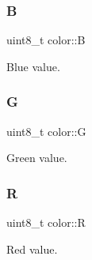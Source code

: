 \subsubsection{\texorpdfstring{B}{B}}
{\footnotesize\ttfamily uint8\+\_\+t color\+::B}



Blue value. 

\mbox{\label{group__video_ga4eca011840c222b0813c622714e7a2b5}} 
\subsubsection{\texorpdfstring{G}{G}}
{\footnotesize\ttfamily uint8\+\_\+t color\+::G}



Green value. 

\mbox{\label{group__video_gacb56ae92e569346b946b93e1723bdcf0}} 
\subsubsection{\texorpdfstring{R}{R}}
{\footnotesize\ttfamily uint8\+\_\+t color\+::R}



Red value. 

